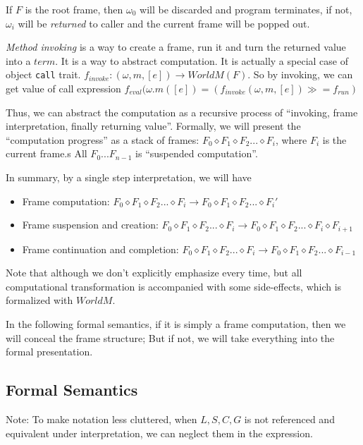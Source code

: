 \documentclass[]{article}
\numberwithin{equation}{section}
\numberwithin{figure}{section}
\numberwithin{table}{section}
\begin{document}
If $F$ is the root frame, then $\omega_0$ will be discarded and program
terminates, if not, $\omega_i$ will be \emph{returned} to caller and the
current frame will be popped out.

\emph{Method invoking} is a way to create a frame, run it and turn the
returned value into a $term$. It is a way to abstract computation. It is
actually a special case of object \texttt{call} trait.
$f_{invoke}: (\omega, m, [e]) \rightarrow WorldM(F)$. So by invoking, we can get
value of call expression
$f_{eval}{(\omega.m([e])} = (f_{invoke}(\omega, m, [e]) \gg = f_{run})$

Thus, we can abstract the computation as a recursive process of
``invoking, frame interpretation, finally returning value''. Formally, we will present the ``computation progress'' as a stack
of frames: $F_0 \diamond F_1 \diamond F_2 ... \diamond F_i$, where $F_i$
is the current frame.s All $F_0 ... F_{n - 1}$ is ``suspended
computation''.

In summary, by a single step interpretation, we will have

\begin{itemize}
\itemsep1pt\parskip0pt
\item
  Frame computation:
  $F_0 \diamond F_1 \diamond F_2 ... \diamond F_i \rightarrow F_0 \diamond F_1 \diamond F_2 ... \diamond F_i'$
\item
  Frame suspension and creation:
  $F_0 \diamond F_1 \diamond F_2 ... \diamond F_i \rightarrow F_0 \diamond F_1 \diamond F_2 ... \diamond F_i \diamond F_{i + 1}$
\item
  Frame continuation and completion:
  $F_0 \diamond F_1 \diamond F_2 ... \diamond F_i \rightarrow F_0 \diamond F_1 \diamond F_2 ... \diamond F_{i - 1}$
\end{itemize}

Note that although we don't explicitly emphasize every time,
but all computational transformation is accompanied with some side-effects,
which is formalized with $WorldM$.

In the following formal semantics, if it is simply a frame computation,
then we will conceal the frame structure; But if not, we will take
everything into the formal presentation.

\subsection{Formal Semantics}\label{formal-semantics}

Note: To make notation less cluttered, when $L, S, C, G$ is not referenced
and equivalent under interpretation, we can neglect them in the
expression.
\end{document}
